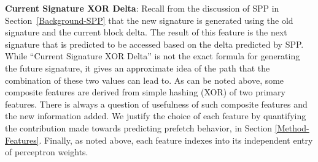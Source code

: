 %
\newline
\newline
\noindent \textbf{Current Signature XOR Delta}: Recall from the
discussion of SPP in Section~\ref{Background-SPP} that the new
signature is generated using the old signature and the current block
delta.  The result of this feature is the next signature that is
predicted to be accessed based on the delta predicted by SPP. While
``Current Signature XOR Delta'' is not the exact formula for
generating the future signature, it gives an approximate idea of the
path that the combination of these two values can lead to.
%
\newline
\newline
As can be noted above, some composite features are derived from simple
hashing (XOR) of two primary features. There is always a question of
usefulness of such composite features and the new information added.
We justify the choice of each feature by quantifying the contribution
made towards predicting prefetch behavior, in Section
\ref{Method-Features}.  Finally, as noted above, each feature indexes
into its independent entry of perceptron weights.

